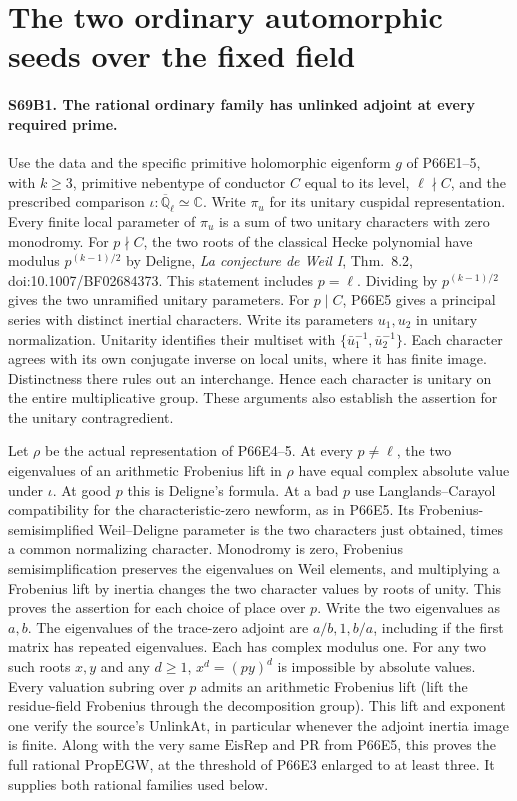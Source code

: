 \section{The two ordinary automorphic seeds over the fixed field}

\paragraph{S69B1. The rational ordinary family has unlinked adjoint at every required prime.}
Use the data and the specific primitive holomorphic eigenform $g$ of
P66E1--5, with $k\ge3$, primitive nebentype of conductor $C$ equal to
its level, $\ell\nmid C$, and the prescribed comparison
$\iota:\overline{\mathbb Q}_\ell\simeq\mathbb C$. Write $\pi_u$
for its unitary cuspidal representation. Every finite local parameter
of $\pi_u$ is a sum of two unitary characters with zero monodromy.
For $p\nmid C$, the two roots of the classical Hecke polynomial
have modulus $p^{(k-1)/2}$ by Deligne,
\emph{La conjecture de Weil I}, Thm.~8.2,
doi:10.1007/BF02684373. This statement includes $p=\ell$.
Dividing by $p^{(k-1)/2}$ gives the two unramified unitary parameters.
For $p\mid C$, P66E5 gives a principal series with distinct
inertial characters. Write its parameters $u_1,u_2$ in unitary
normalization. Unitarity identifies their multiset with
$\{\bar u_1^{-1},\bar u_2^{-1}\}$. Each character agrees with its
own conjugate inverse on local units, where it has finite image.
Distinctness there rules out an interchange. Hence each character
is unitary on the entire multiplicative group. These arguments
also establish the assertion for the unitary contragredient.

Let $\rho$ be the actual representation of P66E4--5. At every
$p\ne\ell$, the two eigenvalues of an arithmetic Frobenius lift
in $\rho$ have equal complex absolute value under $\iota$.
At good $p$ this is Deligne's formula. At a bad $p$ use
Langlands--Carayol compatibility for the characteristic-zero
newform, as in P66E5. Its Frobenius-semisimplified Weil--Deligne
parameter is the two characters just obtained, times a common
normalizing character. Monodromy is zero, Frobenius
semisimplification preserves the eigenvalues on Weil elements,
and multiplying a Frobenius lift by inertia changes the two
character values by roots of unity. This proves the assertion
for each choice of place over $p$. Write the two eigenvalues as
$a,b$. The eigenvalues of the trace-zero adjoint are
$a/b,1,b/a$, including if the first matrix has repeated eigenvalues.
Each has complex modulus one. For any two such roots $x,y$ and
any $d\ge1$, $x^d=(p y)^d$ is impossible by absolute values.
Every valuation subring over $p$ admits an arithmetic Frobenius
lift (lift the residue-field Frobenius through the decomposition
group). This lift and exponent one verify the source's
$\mathrm{UnlinkAt}$, in particular whenever the adjoint inertia
image is finite. Along with the very same $\mathrm{EisRep}$ and
$\mathrm{PR}$ from P66E5, this proves the full rational
$\mathrm{PropEGW}$, at the threshold of P66E3 enlarged to at least
three. It supplies both rational families used below.

